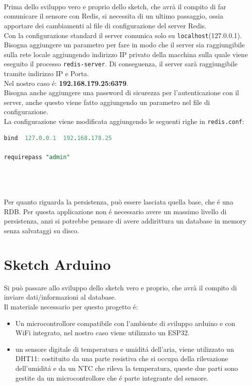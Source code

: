 \\
\\
\\
Prima dello sviluppo vero e proprio dello sketch, che avrà il compito di far comunicare il sensore con Redis,
si necessita di un ultimo passaggio, ossia apportare dei cambiamenti al file di configurazione del server Redis.
\\
Con la configurazione standard il server comunica solo su \texttt{localhost}(127.0.0.1).
Bisogna aggiungere un parametro per fare in modo che il server sia raggiungibile sulla rete locale aggiungendo indirizzo IP
privato della macchina sulla quale viene eseguito il processo \texttt{redis-server}.
Di conseguenza, il server sarà raggiungibile tramite indirizzo IP e Porta.\\
Nel nostro caso é: \textbf{192.168.179.25:6379}.\\
Bisogna anche aggiungere una password di sicurezza per l'autenticazione con il server, anche questo viene fatto
aggiungendo un parametro nel file di configurazione.
\\
La configurazione viene modificata aggiungendo le seguenti righe in \texttt{redis.conf}:
\begin{lstlisting}[autogobble, style=redis-cli, language=SQL]
bind  127.0.0.1  192.168.178.25

requirepass "admin"\end{lstlisting}
\\
\\
\\
Per quanto riguarda la persistenza, può essere lasciata quella base, che é una RDB.
Per questa applicazione non é necessario avere un massimo livello di persistenza, anzi si potrebbe pensare
di avere addirittura un database in memory senza salvataggi su disco.

\section{Sketch Arduino}
Si può passare allo sviluppo dello sketch vero e proprio, che avrà il compito
di inviare dati/informazioni al database.\\
Il materiale necessario per questo progetto é:
\begin{itemize}
    \item Un microcontrollore compatibile con l'ambiente di sviluppo arduino e con WiFi integrato,
          nel nostro caso viene utilizzato un ESP32.
    \item un sensore digitale di temperatura e umiditá dell'aria, viene utilizzato un DHT11: costituito da una parte resistiva
    che si occupa della rilevazione dell'umiditá e da un NTC che rileva la temperatura, queste due parti sono gestite
    da un microcontrollore che é parte integrante del sensore.
\end{itemize}

